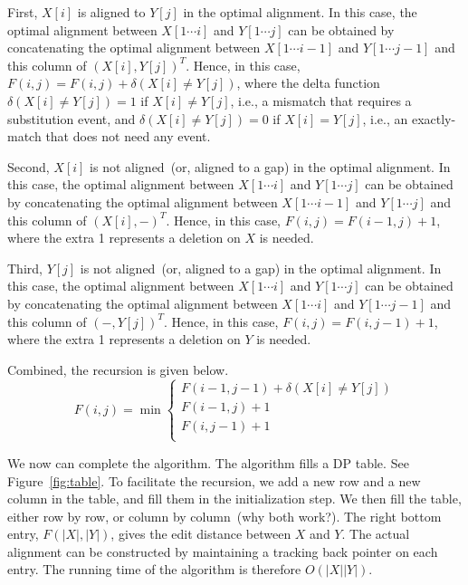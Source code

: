 First, $X[i]$ is aligned to $Y[j]$ in the optimal alignment. In this case, the optimal alignment
between $X[1\cdots i]$ and $Y[1\cdots j]$ can be obtained by concatenating the optimal alignment
between $X[1\cdots i-1]$ and $Y[1\cdots j-1]$ and this column of $(X[i], Y[j])^T$.
Hence, in this case, $F(i,j) = F(i, j) + \delta(X[i] \neq Y[j])$, where the delta function
$\delta(X[i] \neq Y[j]) = 1$ if $X[i] \neq Y[j]$, i.e., a mismatch that requires a substitution event,
and $\delta(X[i] \neq Y[j]) = 0$ if $X[i] = Y[j]$, i.e., an exactly-match that does not need any event.

Second, $X[i]$ is not aligned~(or, aligned to a gap) in the optimal alignment. In this case, the optimal alignment
between $X[1\cdots i]$ and $Y[1\cdots j]$ can be obtained by concatenating the optimal alignment
between $X[1\cdots i-1]$ and $Y[1\cdots j]$ and this column of $(X[i], -)^T$.
Hence, in this case, $F(i,j) = F(i-1, j) + 1$, where 
the extra 1 represents a deletion on $X$ is needed.

Third, $Y[j]$ is not aligned~(or, aligned to a gap) in the optimal alignment. In this case, the optimal alignment
between $X[1\cdots i]$ and $Y[1\cdots j]$ can be obtained by concatenating the optimal alignment
between $X[1\cdots i]$ and $Y[1\cdots j-1]$ and this column of $(-, Y[j])^T$.
Hence, in this case, $F(i,j) = F(i, j- 1) + 1$, where 
the extra 1 represents a deletion on $Y$ is needed.

Combined, the recursion is given below.
\begin{displaymath}
F(i,j) = \min\left\{
	\begin{array}{llll}
	F(i-1,j-1) + \delta(X[i] \neq Y[j]) \\
	F(i-1,j) + 1 \\
	F(i,j-1) + 1 \\
	\end{array}
\right.
\end{displaymath}

We now can complete the algorithm. The algorithm fills a DP table. See Figure~\ref{fig:table}.
To facilitate the recursion, we add a new row and a new column in the table,
and fill them in the initialization step. 
We then fill the table, either row by row, or column by column~(why both work?).
The right bottom entry, $F(|X|, |Y|)$, gives the edit distance between $X$ and $Y$.
The actual alignment can be constructed by maintaining a tracking back pointer on each entry.
The running time of the algorithm is therefore $O(|X||Y|)$.

